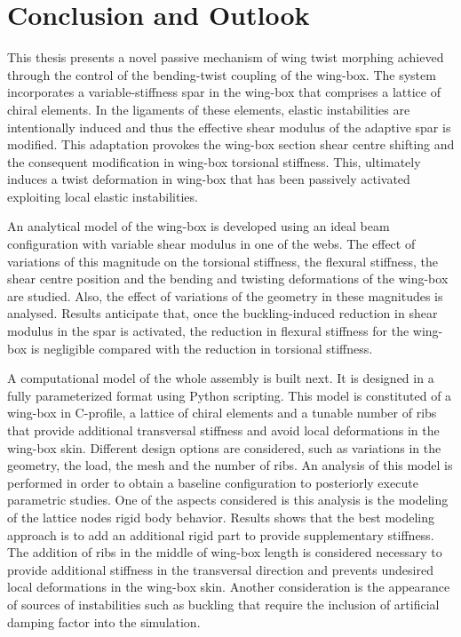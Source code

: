 \chapter{Conclusion and Outlook} \label{chap:summary}
%
%

This thesis presents a novel passive mechanism of wing twist morphing achieved through the control of the bending-twist coupling of the wing-box. The system incorporates a variable-stiffness spar in the wing-box that comprises a lattice of chiral elements. In the ligaments of these elements, elastic instabilities are intentionally induced and thus the effective shear modulus of the adaptive spar is modified. This adaptation provokes the wing-box section shear centre shifting and the consequent modification in wing-box torsional stiffness. This, ultimately induces a twist deformation in wing-box that has been passively activated exploiting local elastic instabilities.

An analytical model of the wing-box is developed using an ideal beam configuration with variable shear modulus in one of the webs. The effect of variations of this magnitude on the torsional stiffness, the flexural stiffness, the shear centre position and the bending and twisting deformations of the wing-box are studied. Also, the effect of variations of the geometry in these magnitudes is analysed. Results anticipate that, once the buckling-induced reduction in shear modulus in the spar is activated, the reduction in flexural stiffness for the wing-box is negligible compared with the reduction in torsional stiffness. 

A computational model of the whole assembly is built next. It is designed in a fully parameterized format using Python scripting. This model is constituted of a wing-box in C-profile, a lattice of chiral elements and a tunable number of ribs that provide additional transversal stiffness and avoid local deformations in the wing-box skin. Different design options are considered, such as variations in the geometry, the load, the mesh and the number of ribs. An analysis of this model is performed in order to obtain a baseline configuration to posteriorly execute parametric studies. One of the aspects considered is this analysis is the modeling of the lattice nodes rigid body behavior. Results shows that the best modeling approach is to add an additional rigid part to provide supplementary stiffness. The addition of ribs in the middle of wing-box length is considered necessary to provide additional stiffness in the transversal direction and prevents undesired local deformations in the wing-box skin. Another consideration is the appearance of sources of instabilities such as buckling that require the inclusion of artificial damping factor into the simulation. 

